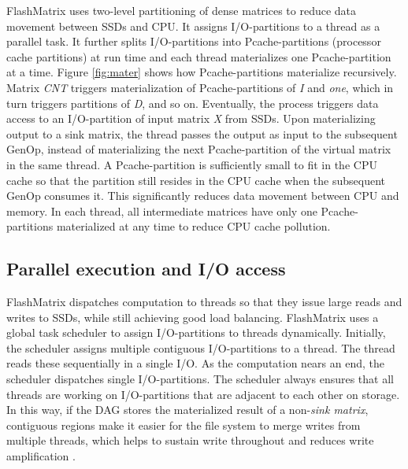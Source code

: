 FlashMatrix uses two-level partitioning of dense matrices
to reduce data movement between SSDs and CPU. It assigns I/O-partitions
to a thread as a parallel task.
It further splits I/O-partitions into Pcache-partitions (processor cache
partitions) at run time and each thread materializes one Pcache-partition
at a time. 
Figure \ref{fig:mater} shows how Pcache-partitions
materialize recursively. Matrix \textit{CNT} triggers materialization of
Pcache-partitions of \textit{I} and \textit{one}, which in turn triggers 
partitions of \textit{D}, and so on. Eventually, the process triggers data access
to an I/O-partition of input matrix \textit{X} from SSDs. Upon materializing
output to a sink matrix, the thread passes the output as input to the subsequent
GenOp, instead of materializing the next Pcache-partition of the virtual matrix
in the same thread.
A Pcache-partition is sufficiently small to fit in the CPU cache so that
the partition still resides in the CPU cache when the subsequent GenOp consumes
it. This significantly reduces data movement between CPU and memory. In each
thread, all intermediate matrices have only one Pcache-partitions materialized
at any time to reduce CPU cache pollution.



\vspace{-8pt}
\subsection{Parallel execution and I/O access}
\vspace{-4pt}
FlashMatrix dispatches computation to threads so that they
issue large reads and writes to SSDs, while still achieving good load balancing.
%
FlashMatrix uses a global task scheduler to assign 
I/O-partitions to threads dynamically. Initially,
the scheduler assigns multiple contiguous I/O-partitions to a thread.
The thread reads these sequentially in a single I/O.
As the computation nears an end, the scheduler dispatches single I/O-partitions. 
The scheduler always ensures that all threads are working on I/O-partitions that are adjacent to
each other on storage.
In this way, if the DAG stores the materialized result of a non-\textit{sink matrix}, 
contiguous regions make it easier for the file system to merge
writes from multiple threads, which helps to sustain write throughout and reduces
write amplification \cite{}.

